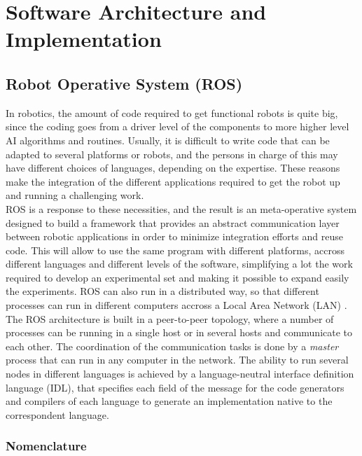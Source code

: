 \chapter{Software Architecture and Implementation}
\label{chap:Software_Architecture_and_Implementation}

\section{Robot Operative System (ROS)}

In robotics, the amount of code required to get functional robots is quite big, since the coding goes from a driver level of the components to more higher level AI algorithms and routines. Usually, it is difficult to write code that can be adapted to several platforms or robots, and the persons in charge of this may have different choices of languages, depending on the expertise. These reasons make the integration of the different applications required to get the robot up and running a challenging work.\\

ROS is a response to these necessities, and the result is an meta-operative system designed to build a framework that provides an abstract communication layer between robotic applications in order to minimize integration efforts and reuse code. This will allow to use the same program with different platforms, accross different languages and different levels of the software, simplifying a lot the work required to develop an experimental set and making it possible to expand easily the experiments. ROS can also run in a distributed way, so that different processes can run in different computers accross a Local Area Network (LAN) \cite{Quigley}.\\

The ROS architecture is built in a peer-to-peer topology, where a number of processes can be running in a single host or in several hosts and communicate to each other. The coordination of the communication tasks is done by a \emph{master} process that can run in any computer in the network. The ability to run several nodes in different languages is achieved by a language-neutral interface definition language (IDL), that specifies each field of the message for the code generators and compilers of each language to generate an implementation native to the correspondent language. 

\subsection{Nomenclature}

